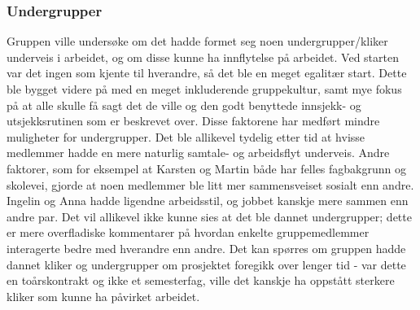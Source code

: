 \subsubsection{Undergrupper}

Gruppen ville undersøke om det hadde formet seg noen undergrupper/kliker underveis i arbeidet, og om disse kunne ha innflytelse på arbeidet. Ved starten var det ingen som kjente til hverandre, så det ble en meget egalitær start. Dette ble bygget videre på med en meget inkluderende gruppekultur, samt mye fokus på at alle skulle få sagt det de ville og den godt benyttede innsjekk- og utsjekksrutinen som er beskrevet over. Disse faktorene har medført mindre muligheter for undergrupper. Det ble allikevel tydelig etter tid at hvisse medlemmer hadde en mere naturlig samtale- og arbeidsflyt underveis. Andre faktorer, som for eksempel at Karsten og Martin både har felles fagbakgrunn og skolevei, gjorde at noen medlemmer ble litt mer sammensveiset sosialt enn andre. Ingelin og Anna hadde ligendne arbeidsstil, og jobbet kanskje mere sammen enn andre par. 
Det vil allikevel ikke kunne sies at det ble dannet undergrupper; dette er mere overfladiske kommentarer på hvordan enkelte gruppemedlemmer interagerte bedre med hverandre enn andre. Det kan spørres om gruppen hadde dannet kliker og undergrupper om prosjektet foregikk over lenger tid - var dette en toårskontrakt og ikke et semesterfag, ville det kanskje ha oppstått sterkere kliker som kunne ha påvirket arbeidet. 